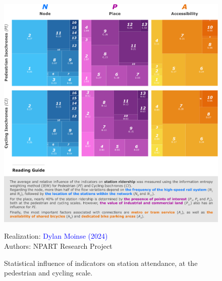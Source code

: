 \begin{refsegment}
    \begin{figure}[h!]\vspace*{4pt}
        \caption{Statistical influence of indicators on station attendance, at the pedestrian and cycling scale.}
        \label{fig-chap6:resultats-poids-iew-statistiques}
        \centerline{\includegraphics[width=1\columnwidth]{src/Figures/Chap-6/EN_NPART_Poids_Statistiques_IEW_Indicateurs.pdf}}
        \vspace{5pt}
        \begin{flushright}\scriptsize{
        Realization: \textcolor{blue}{Dylan Moinse (2024)}
        \\
        Authors: \acrshort{NPART} Research Project
        }\end{flushright}
    \end{figure}


\end{refsegment}
